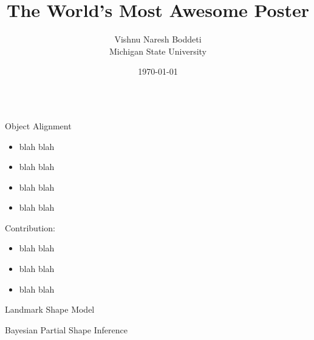 \documentclass[final,red]{beamer}
\title{\Huge The World's Most Awesome Poster}
\author{Vishnu Naresh Boddeti \\ Michigan State University}
\institute[Michigan State University]{Michigan State University, East Lansing, MI, USA}
\date[\today]{\today}
\begin{document}
\begin{frame}{}
\begin{columns}[t]

\begin{column}{.3\linewidth}
\begin{block}{Object Alignment}
\begin{itemize}
		\item blah blah
		\item blah blah
    \vspace{1cm}
    \begin{figure}
    \centering
    \begin{subfigure}{0.9\textwidth}
    \end{subfigure}
    \hspace{2cm}
    \begin{subfigure}{0.9\textwidth}
    \end{subfigure}
    
    \end{figure}
    \vspace{1cm}
    \item blah blah
    \item blah blah
	\end{itemize}
  \vspace{1cm}
  \begin{exampleblock}{{\large Contribution:}}
  \end{exampleblock}
  \vspace{-1cm}
  \begin{itemize}
  \item blah blah
  \item blah blah
  \item blah blah
  \end{itemize}
\end{block}

\begin{block}{Landmark Shape Model}
\vspace{-1cm}
\begin{exampleblock}{Bayesian Partial Shape Inference}
\end{exampleblock}

\begin{columns}
\begin{column}{0.4\linewidth}
\begin{figure}
	\centering
\end{figure}
\end{column}


\end{columns}
\end{block}
\end{column}
\end{columns}
\end{frame}
\end{document}
